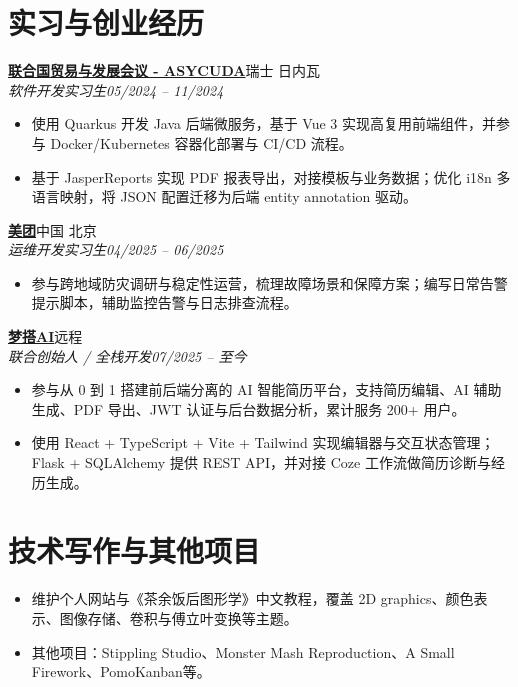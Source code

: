 \documentclass[10pt,fontset=none]{ctexart}
\newcommand{\entry}[4]{\textbf{#1}\hfill #2\\\textit{#3}\hfill\textit{#4}}
\begin{document}
\section*{实习与创业经历}
\entry{\href{https://asycuda.org/en/}{联合国贸易与发展会议 - ASYCUDA}}{瑞士 日内瓦}{软件开发实习生}{05/2024 -- 11/2024}
\begin{itemize}
  \item 使用 Quarkus 开发 Java 后端微服务，基于 Vue 3 实现高复用前端组件，并参与 Docker/Kubernetes 容器化部署与 CI/CD 流程。
  \item 基于 JasperReports 实现 PDF 报表导出，对接模板与业务数据；优化 i18n 多语言映射，将 JSON 配置迁移为后端 entity annotation 驱动。
\end{itemize}

\entry{\href{https://www.meituan.com/}{美团}}{中国 北京}{运维开发实习生}{04/2025 -- 06/2025}
\begin{itemize}
  \item 参与跨地域防灾调研与稳定性运营，梳理故障场景和保障方案；编写日常告警提示脚本，辅助监控告警与日志排查流程。
\end{itemize}

\entry{\href{http://mengdaai.com/}{梦搭AI}}{远程}{联合创始人 / 全栈开发}{07/2025 -- 至今}
\begin{itemize}
  \item 参与从 0 到 1 搭建前后端分离的 AI 智能简历平台，支持简历编辑、AI 辅助生成、PDF 导出、JWT 认证与后台数据分析，累计服务 200+ 用户。
  \item 使用 React + TypeScript + Vite + Tailwind 实现编辑器与交互状态管理；Flask + SQLAlchemy 提供 REST API，并对接 Coze 工作流做简历诊断与经历生成。
\end{itemize}

\section*{技术写作与其他项目}
\begin{itemize}
  \item 维护个人网站与《茶余饭后图形学》中文教程，覆盖 2D graphics、颜色表示、图像存储、卷积与傅立叶变换等主题。
  \item 其他项目：Stippling Studio、Monster Mash Reproduction、A Small Firework、PomoKanban等。
\end{itemize}
\end{document}
